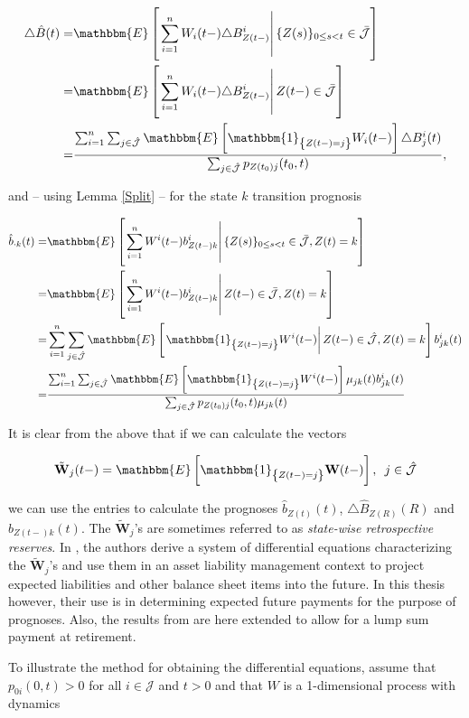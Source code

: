 \documentclass{book}
\newcommand{\1}[1]{\mathbbm{1}_{\left\lbrace #1 \right\rbrace}}
\newcommand{\expec}[1][def]{\mathbbm{E} \left[ #1 \right]}
\newcommand{\econd}[2][def]{\mathbbm{E} \left[ \left. #1 \right| #2 \right]}
\theoremstyle{break}
\theoremstyle{remark}
\numberwithin{equation}{section}
\begin{document}
\begin{align*}
\triangle \hat{B}(t) =& \econd[\sum_{i=1}^n W_i(t-) \triangle B_{Z(t-)}^i]{\{Z(s) \}_{0 \leq s < t} \in \bar{\mathcal{J}}} \\
=& \econd[\sum_{i=1}^n W_i(t-) \triangle B_{Z(t-)}^i]{Z(t-) \in \bar{\mathcal{J}}} \\
=&\frac{\sum_{i=1}^n \sum_{j \in \hat{\mathcal{J}}} \expec[\1{Z(t-)=j} W_i(t-)] \triangle B_j^i(t)}{\sum_{j \in \hat{\mathcal{J}}} p_{Z(t_0)j}(t_0,t)},
\end{align*}

and -- using Lemma \ref{Split} -- for the state $k$ transition prognosis

\begin{align*}
\hat{b}_{\cdot k}(t) =& \econd[\sum_{i=1}^n W^i(t-)b_{Z(t-)k}^i]{\{Z(s) \}_{0 \leq s < t} \in \bar{\mathcal{J}}, Z(t)=k} \\
=& \econd[\sum_{i=1}^n W^i(t-)b_{Z(t-)k}^i]{Z(t-) \in \bar{\mathcal{J}}, Z(t)=k} \\
=& \sum_{i=1}^n \sum_{j \in \hat{\mathcal{J}}} \econd[\1{Z(t-)=j} W^i(t-)]{Z(t-) \in \hat{\mathcal{J}}, Z(t) = k} b_{jk}^i(t) \\
=& \frac{\sum_{i=1}^n \sum_{j \in \hat{\mathcal{J}}} \expec[\1{Z(t-)=j} W^i(t-)] \mu_{jk}(t) b_{jk}^i(t)}{\sum_{j \in \hat{\mathcal{J}}} p_{Z(t_0)j}(t_0,t) \mu_{jk}(t)}
\end{align*}

It is clear from the above that if we can calculate the vectors

\begin{align*}
\tilde{\textbf{W}}_j(t-) = \expec[\1{Z(t-)=j} \textbf{W}(t-)], \, \, \, j \in \hat{\mathcal{J}}
\end{align*}


we can use the entries to calculate the prognoses $\hat{b}_{Z(t)}(t)$, $\triangle  \hat{B}_{Z(R)}(R)$ and $\hat{b}_{Z(t-)k}(t)$. The $\tilde{\textbf{W}}_j$'s are sometimes referred to as \textit{state-wise retrospective reserves}. In \cite{Lollike}, the authors derive a system of differential equations characterizing the $\tilde{\textbf{W}}_j$'s and use them in an asset liability management context to project expected liabilities and other balance sheet items into the future. In this thesis however, their use is in determining expected future payments for the purpose of prognoses. Also, the results from \cite{Lollike} are here extended to allow for a lump sum payment at retirement.

To illustrate the method for obtaining the differential equations, assume that $p_{0i}(0,t)>0$ for all $i \in \mathcal{J}$ and $t>0$ and that $W$ is a 1-dimensional process with dynamics
\end{document}
